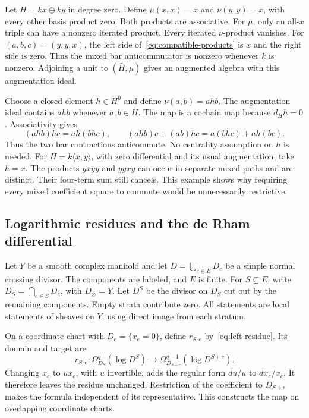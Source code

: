 \begin{example}
\label{ex:incompatible-products}
Let $\bar H=kx\oplus ky$ in degree zero.
Define $\mu(x,x)=x$ and $\nu(y,y)=x$, with every other basis product zero.
Both products are associative.
For $\mu$, only an all-$x$ triple can have a nonzero iterated product.
Every iterated $\nu$-product vanishes.
For $(a,b,c)=(y,y,x)$, the left side of~\eqref{eq:compatible-products} is $x$ and the right side is zero.
Thus the mixed bar anticommutator is nonzero whenever $k$ is nonzero.
Adjoining a unit to $(\bar H,\mu)$ gives an augmented algebra with this augmentation ideal.
\end{example}

\begin{example}
\label{ex:inserted-element}
Choose a closed element $h\in H^0$ and define $\nu(a,b)=ahb$.
The augmentation ideal contains $ahb$ whenever $a,b\in\bar H$.
The map is a cochain map because $d_Hh=0$.
Associativity gives
\[
(ahb)hc=ah(bhc),\qquad
(ahb)c+(ab)hc=a(bhc)+ah(bc).
\]
Thus the two bar contractions anticommute.
No centrality assumption on $h$ is needed.
For $H=k\langle x,y\rangle$, with zero differential and its usual augmentation, take $h=x$.
The products $yxyy$ and $yyxy$ can occur in separate mixed paths and are distinct.
Their four-term sum still cancels.
This example shows why requiring every mixed coefficient square to commute would be unnecessarily restrictive.
\end{example}

\subsection{Logarithmic residues and the de Rham differential}
\label{subsec:logarithmic-comparison}

Let $Y$ be a smooth complex manifold and let $D=\bigcup_{e\in E}D_e$ be a simple normal crossing divisor.
The components are labeled, and $E$ is finite.
For $S\subseteq E$, write $D_S=\bigcap_{e\in S}D_e$, with $D_\varnothing=Y$.
Let $D^S$ be the divisor on $D_S$ cut out by the remaining components.
Empty strata contribute zero.
All statements are local statements of sheaves on $Y$, using direct image from each stratum.

On a coordinate chart with $D_e=\{x_e=0\}$, define $r_{S,e}$ by~\eqref{eq:left-residue}.
Its domain and target are
\[
r_{S,e}:\Omega^q_{D_S}(\log D^S)
\longrightarrow\Omega^{q-1}_{D_{S+e}}(\log D^{S+e}).
\]
Changing $x_e$ to $u x_e$, with $u$ invertible, adds the regular form $du/u$ to $dx_e/x_e$.
It therefore leaves the residue unchanged.
Restriction of the coefficient to $D_{S+e}$ makes the formula independent of its representative.
This constructs the map on overlapping coordinate charts.


